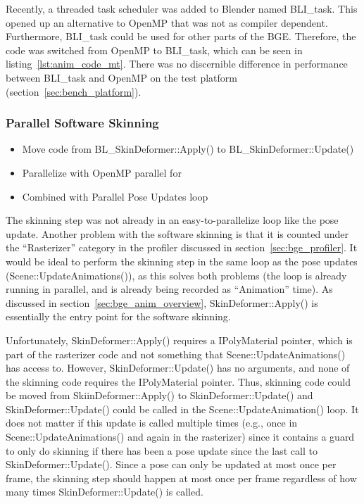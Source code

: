 Recently, a threaded task scheduler was added to Blender named BLI\_task. 
This opened up an alternative to OpenMP that was not as compiler dependent.
Furthermore, BLI\_task could be used for other parts of the BGE.
Therefore, the code was switched from OpenMP to BLI\_task, which can be seen in listing~\ref{lst:anim_code_mt}.
There was no discernible difference in performance between BLI\_task and OpenMP on the test platform (section~\ref{sec:bench_platform}).



\subsubsection{Parallel Software Skinning}
\label{sec:parallel_software_skinning}
\ifsummaries
\begin{itemize}
 \item Move code from BL\_SkinDeformer::Apply() to BL\_SkinDeformer::Update()
 \item Parallelize with OpenMP parallel for
 \item Combined with Parallel Pose Updates loop
\end{itemize}
\fi

The skinning step was not already in an easy-to-parallelize loop like the pose update.
Another problem with the software skinning is that it is counted under the ``Rasterizer'' category in the profiler discussed in section~\ref{sec:bge_profiler}.
It would be ideal to perform the skinning step in the same loop as the pose updates (Scene::UpdateAnimations()), as this solves both problems (the loop is already running in parallel, and is already being recorded as ``Animation'' time).
As discussed in section~\ref{sec:bge_anim_overview}, SkinDeformer::Apply() is essentially the entry point for the software skinning.

Unfortunately, SkinDeformer::Apply() requires a IPolyMaterial pointer, which is part of the rasterizer code and not something that Scene::UpdateAnimations() has access to.
However, SkinDeformer::Update() has no arguments, and none of the skinning code requires the IPolyMaterial pointer.
Thus, skinning code could be moved from SkiinDeformer::Apply() to SkinDeformer::Update() and SkinDeformer::Update() could be called in the Scene::UpdateAnimation() loop.
It does not matter if this update is called multiple times (e.g., once in Scene::UpdateAnimations() and again in the rasterizer) since it contains a guard to only do skinning if there has been a pose update since the last call to SkinDeformer::Update().
Since a pose can only be updated at most once per frame, the skinning step should happen at most once per frame regardless of how many times SkinDeformer::Update() is called.

